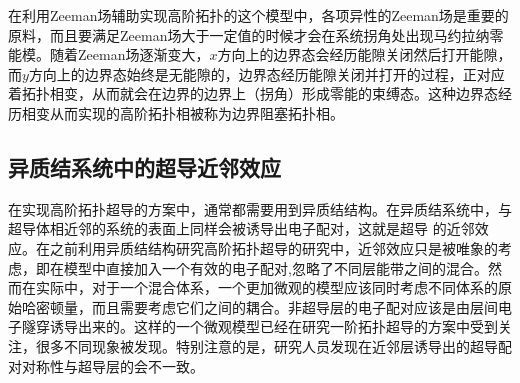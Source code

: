 在利用Zeeman场辅助实现高阶拓扑的这个模型中，各项异性的Zeeman场是重要的原料，而且要满足Zeeman场大于一定值的时候才会在系统拐角处出现马约拉纳零能模。随着Zeeman场逐渐变大，$x$方向上的边界态会经历能隙关闭然后打开能隙，而$y$方向上的边界态始终是无能隙的，边界态经历能隙关闭并打开的过程，正对应着拓扑相变，从而就会在边界的边界上（拐角）形成零能的束缚态。这种边界态经历相变从而实现的高阶拓扑相被称为边界阻塞拓扑相\cite{re46}。
\subsection{异质结系统中的超导近邻效应}
 在实现高阶拓扑超导的方案中，通常都需要用到异质结结构\cite{re27,re28,re29,re34,re38,re39,re45}。在异质结系统中，与超导体相近邻的系统的表面上同样会被诱导出电子配对，这就是超导
的近邻效应。在之前利用异质结结构研究高阶拓扑超导的研究中，近邻效应只是被唯象的考虑，即在模型中直接加入一个有效的电子配对,忽略了不同层能带之间的混合\cite{re27,re28,re29,re34,re38,re39,re45}。然而在实际中，对于一个混合体系，一个更加微观的模型应该同时考虑不同体系的原始哈密顿量，而且需要考虑它们之间的耦合。非超导层的电子配对应该是由层间电子隧穿诱导出来的。这样的一个微观模型已经在研究一阶拓扑超导的方案中受到关注，很多不同现象被发现\cite{re47,re48,re49,re50,re51,re52,re53,re54,re55}。特别注意的是，研究人员发现在近邻层诱导出的超导配对对称性与超导层的会不一致\cite{re48,re49}。

